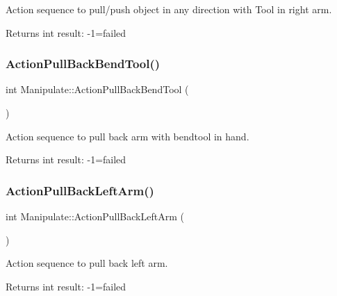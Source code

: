 Action sequence to pull/push object in any direction with Tool in right arm. 

\begin{DoxyReturn}{Returns}
int result\+: -\/1=failed 
\end{DoxyReturn}
\mbox{\label{structManipulate_ab094520fdf91df726e8458724bd10eaf}} 
\subsubsection{\texorpdfstring{Action\+Pull\+Back\+Bend\+Tool()}{ActionPullBackBendTool()}}
{\footnotesize\ttfamily int Manipulate\+::\+Action\+Pull\+Back\+Bend\+Tool (\begin{DoxyParamCaption}{ }\end{DoxyParamCaption})\hspace{0.3cm}{\ttfamily [private]}}



Action sequence to pull back arm with bendtool in hand. 

\begin{DoxyReturn}{Returns}
int result\+: -\/1=failed 
\end{DoxyReturn}
\mbox{\label{structManipulate_ad24d102e05574988b0d5410f72af55d9}} 
\subsubsection{\texorpdfstring{Action\+Pull\+Back\+Left\+Arm()}{ActionPullBackLeftArm()}}
{\footnotesize\ttfamily int Manipulate\+::\+Action\+Pull\+Back\+Left\+Arm (\begin{DoxyParamCaption}{ }\end{DoxyParamCaption})\hspace{0.3cm}{\ttfamily [private]}}



Action sequence to pull back left arm. 

\begin{DoxyReturn}{Returns}
int result\+: -\/1=failed 
\end{DoxyReturn}
\mbox{\label{structManipulate_aad9e6bf0e8c675cdc6a516effcaca20c}} 
